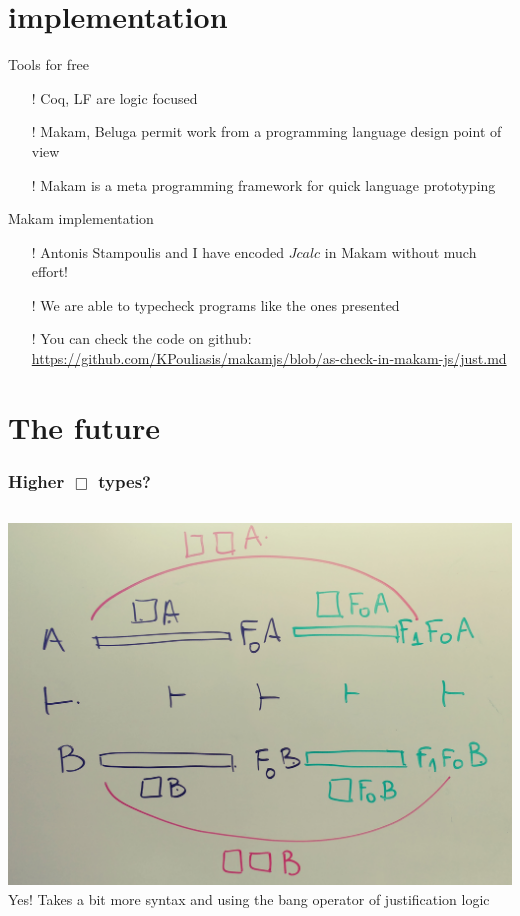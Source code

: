 \documentclass{beamer}
\begin{document}
   \section{implementation} 
   \begin{frame}{Tools for free}
      \begin{itemize}
         \item[!] Coq, LF are logic focused
         \item[!] Makam, Beluga permit work from a programming language design point of view
          \item[!] Makam is a meta programming framework for quick language prototyping
        \end{itemize}
      \end{frame}
    \begin{frame}{Makam implementation}
      \begin{itemize}
      \item[!] Antonis Stampoulis and I have encoded   $Jcalc$ in Makam without much effort!
      \item[!] We are able to typecheck programs like the ones presented
      \item[!] You can check the code on github: \url{https://github.com/KPouliasis/makamjs/blob/as-check-in-makam-js/just.md}
      
      \end{itemize}
    \end{frame}
  \section{The future}
        
    \begin{frame}
      \frametitle{Higher $\Box$ types?}
      \begin{columns}
      \includegraphics[scale=0.05]{pics/20171111_141413_Film1}
          Yes! Takes  a bit more syntax and using the bang operator of justification logic
    \end{columns}
      \end{frame}
  
\end{document}
